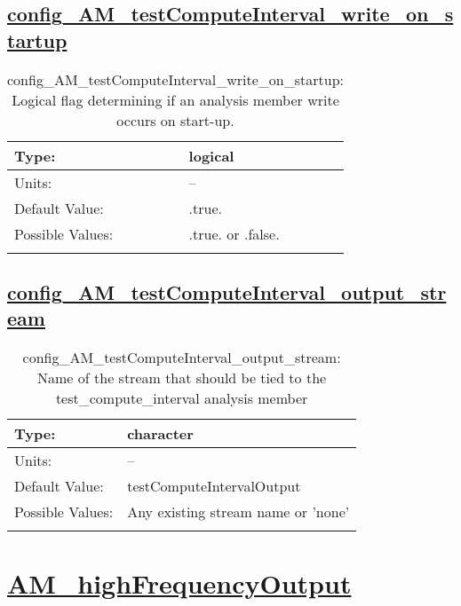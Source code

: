 \subsection[config\_AM\_testComputeInterval\_write\_on\_startup]{\hyperref[sec:nm_tab_AM_testComputeInterval]{config\_AM\_testComputeInterval\_write\_on\_startup}}
\label{subsec:nm_sec_config_AM_testComputeInterval_write_on_startup}
\begin{center}
\begin{longtable}{| p{2.0in} || p{4.0in} |}
    \hline
    Type: & logical \\
    \hline
    Units: & -- \\
    \hline
    Default Value: & .true. \\
    \hline
    Possible Values: & .true. or .false. \\
    \hline
    \caption{config\_AM\_testComputeInterval\_write\_on\_startup: Logical flag determining if an analysis member write occurs on start-up.}
\end{longtable}
\end{center}
\subsection[config\_AM\_testComputeInterval\_output\_stream]{\hyperref[sec:nm_tab_AM_testComputeInterval]{config\_AM\_testComputeInterval\_output\_stream}}
\label{subsec:nm_sec_config_AM_testComputeInterval_output_stream}
\begin{center}
\begin{longtable}{| p{2.0in} || p{4.0in} |}
    \hline
    Type: & character \\
    \hline
    Units: & -- \\
    \hline
    Default Value: & testComputeIntervalOutput \\
    \hline
    Possible Values: & Any existing stream name or 'none' \\
    \hline
    \caption{config\_AM\_testComputeInterval\_output\_stream: Name of the stream that should be tied to the test\_compute\_interval analysis member}
\end{longtable}
\end{center}
\section[AM\_highFrequencyOutput]{\hyperref[sec:nm_tab_AM_highFrequencyOutput]{AM\_highFrequencyOutput}}
\label{sec:nm_sec_AM_highFrequencyOutput}
